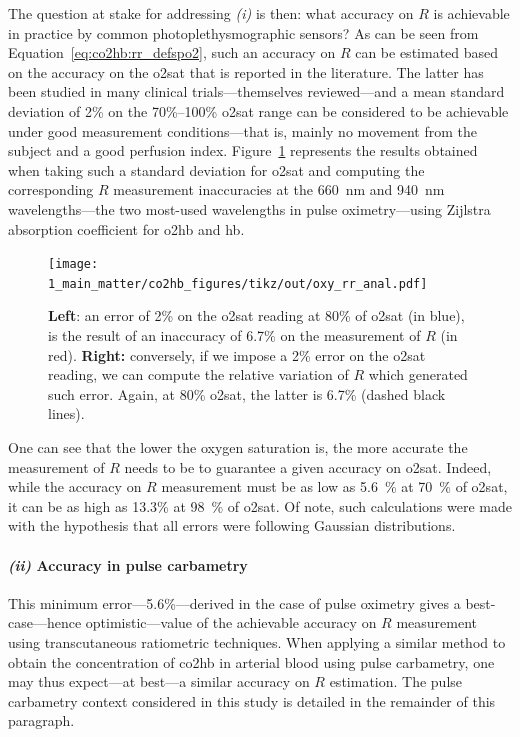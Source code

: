 The question at stake for addressing \textit{(i)} is then: what accuracy on $R$ is achievable in practice by common photoplethysmographic sensors? As can be seen from Equation~\ref{eq:co2hb:rr_defspo2}, such an accuracy on $R$ can be estimated based on the accuracy on the \gls{o2sat} that is reported in the literature. The latter has been studied in many clinical trials---themselves reviewed\cite{nitzan2014, jubran2015}---and a mean standard deviation of 2\% on the 70\%--100\% \gls{o2sat} range can be considered to be achievable under good measurement conditions---that is, mainly no movement from the subject and a good perfusion index. Figure~\ref{fig:oxy_acc} represents the results obtained when taking such a standard deviation for \gls{o2sat} and computing the corresponding $R$ measurement inaccuracies at the 660~nm and 940~nm wavelengths---the two most-used wavelengths in pulse oximetry---using Zijlstra \etal{}\cite{zijlstra2000} absorption coefficient for \gls{o2hb} and \gls{hb}.

\begin{figure}
	\centering
	\texttt{[image: 1\_main\_matter/co2hb\_figures/tikz/out/oxy\_rr\_anal.pdf]}
	\caption[Pulse oximetry ratio of ratios error]{\textbf{Left}: an error of 2\% on the \gls{o2sat} reading at 80\% of \gls{o2sat} (in blue), is the result of an inaccuracy of 6.7\% on the measurement of $R$ (in red). \textbf{Right:} conversely, if we impose a 2\% error on the \gls{o2sat} reading, we can compute the relative variation of $R$ which generated such error. Again, at 80\% \gls{o2sat}, the latter is 6.7\% (dashed black lines).}
	\label{fig:oxy_acc}
\end{figure}

One can see that the lower the oxygen saturation is, the more accurate the measurement of $R$ needs to be to guarantee a given accuracy on \gls{o2sat}. Indeed, while the accuracy on $R$ measurement must be as low as 5.6~\% at 70~\% of \gls{o2sat}, it can be as high as 13.3\% at 98~\% of \gls{o2sat}. Of note, such calculations were made with the hypothesis that all errors were following Gaussian distributions.

\paragraph{\textit{(ii)} Accuracy in pulse carbametry}

This minimum error---5.6\%---derived in the case of pulse oximetry gives a best-case---hence optimistic---value of the achievable accuracy on $R$ measurement using transcutaneous ratiometric techniques. When applying a similar method to obtain the concentration of \gls{co2hb} in arterial blood using pulse carbametry, one may thus expect---at best---a similar accuracy on $R$ estimation. The pulse carbametry context considered in this study is detailed in the remainder of this paragraph.

